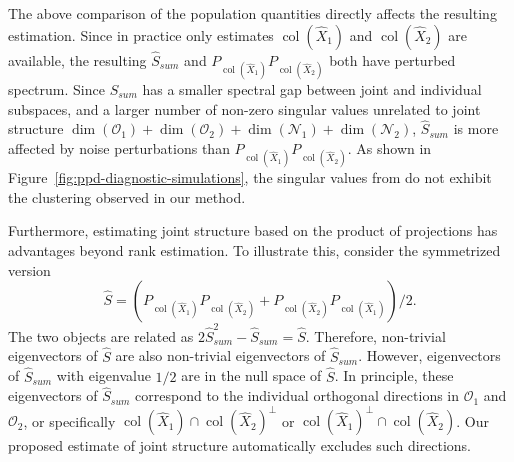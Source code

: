 \documentclass{amsart}
\DeclareMathOperator*{\col}{col}
\newcommand{\Ncal}{\mathcal{N}}
\newcommand{\Ocal}{\mathcal{O}}
\begin{document}
The above comparison of the population quantities directly affects the resulting estimation. Since in practice only estimates $\col(\widehat X_1)$ and $\col(\widehat X_2)$ are available, the resulting $\widehat S_{sum}$ and $P_{\col (\widehat X_1)} P_{\col (\widehat X_2)}$ both have perturbed spectrum. Since $S_{sum}$ has a smaller spectral gap between joint and individual subspaces, and a larger number of non-zero singular values unrelated to joint structure $\dim(\Ocal_1) + \dim(\Ocal_2) +  \dim(\Ncal_1) + \dim(\Ncal_2)$, $\widehat S_{sum}$ is more affected by noise perturbations than $P_{\col (\widehat X_1)} P_{\col (\widehat X_2)}$. As shown in Figure~\ref{fig:ppd-diagnostic-simulations}, the singular values from \citet{feng2018angle} do not exhibit the clustering observed in our method. 

Furthermore, estimating joint structure based on the product of projections has advantages beyond rank estimation.  To illustrate this, consider the symmetrized version
$$
\widehat{S} = (P_{\col (\widehat X_1)} P_{\col (\widehat X_2)} + P_{\col (\widehat X_2)} P_{\col (\widehat X_1)})/2.
$$
The two objects are related as $2\widehat S_{sum}^2 - \widehat S_{sum} = \widehat{S}$.
 Therefore, non-trivial eigenvectors of $\widehat{S}$ are also non-trivial eigenvectors of $\widehat S_{sum}$. However, eigenvectors of $\widehat S_{sum}$ with eigenvalue $1/2$ are in the null space of $\widehat{S}$. In principle, these eigenvectors of $\widehat S_{sum}$ correspond to the individual orthogonal directions in $\Ocal_1$ and $\Ocal_2$, or specifically $\col(\widehat{X}_1) \cap \col(\widehat{X}_2)^\perp$ or $\col(\widehat{X}_1)^\perp \cap \col(\widehat{X}_2)$. Our proposed estimate of joint structure automatically excludes such directions. 
\end{document}

